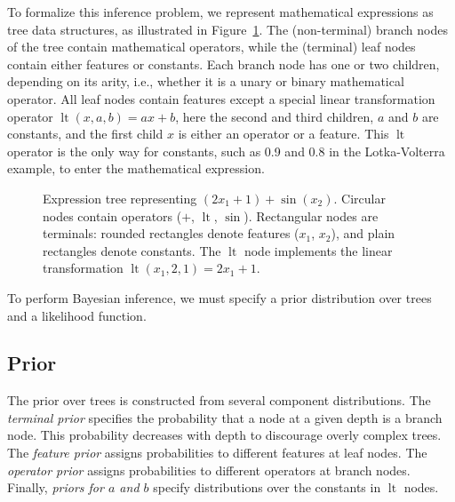 \documentclass{ifacconf}
\DeclareMathOperator{\lt}{lt}
\begin{document}
	To formalize this inference problem, we represent mathematical expressions as tree data structures, as illustrated in Figure~\ref{fig:tree}.
	The (non-terminal) branch nodes of the tree contain mathematical operators,
	while the (terminal) leaf nodes contain either features or constants.
	Each branch node has one or two children, depending on its arity, i.e., whether it is a unary or binary mathematical operator.
	All leaf nodes contain features except a special linear transformation operator $\lt(x,a,b)=ax+b$, here the second and third children, $a$ and $b$ are constants, and the first child $x$ is either an operator or a feature.
	This $\lt$ operator is the only way for constants, such as 0.9 and 0.8 in the Lotka-Volterra example, to enter the mathematical expression.
	
	\begin{figure}[htbp]
		\centering
		\caption{Expression tree representing $(2x_1+1) + \sin(x_2)$. Circular nodes contain operators ($+$, $\lt$, $\sin$). Rectangular nodes are terminals: rounded rectangles denote features ($x_1$, $x_2$), and plain rectangles denote constants. The $\lt$ node implements the linear transformation $\lt(x_1,2,1) = 2x_1 + 1$.}
		\label{fig:tree}
	\end{figure}
	
	To perform Bayesian inference, we must specify a prior distribution over trees and a likelihood function.
	\subsection{Prior}
	The prior over trees is constructed from several component distributions.
	The \textit{terminal prior} specifies the probability that a node at a given depth is a branch node.
	This probability decreases with depth to discourage overly complex trees.
	The \textit{feature prior} assigns probabilities to different features at leaf nodes.
	The \textit{operator prior} assigns probabilities to different operators at branch nodes.
	Finally, \textit{priors for $a$ and $b$} specify distributions over the constants in $\lt$ nodes.
	
\end{document}

